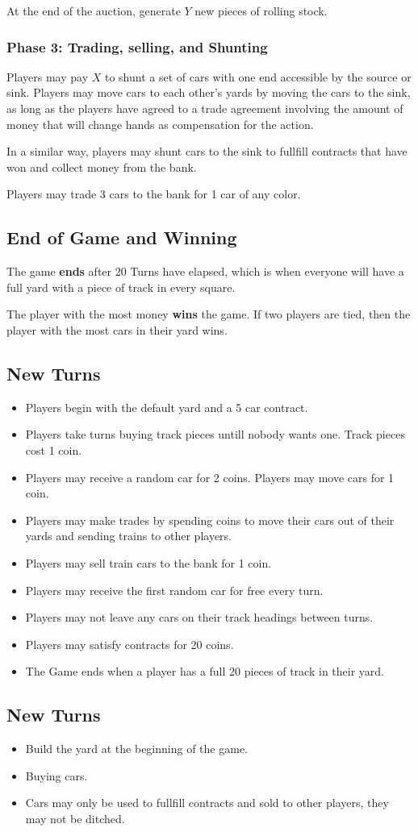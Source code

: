 \documentclass[12pt, letterpaper]{article}
\begin{document}
At the end of the auction, generate $Y$ new pieces of rolling stock.

\subsubsection{Phase 3: Trading, selling, and Shunting}

Players may pay $X$ to shunt a set of cars with one end accessible by the source or sink. Players may move cars to each other's yards by moving the cars to the sink, as long as the players have agreed to a trade agreement involving the amount of money that will change hands as compensation for the action.

In a similar way, players may shunt cars to the sink to fullfill contracts that have won and collect money from the bank.

Players may trade 3 cars to the bank for 1 car of any color.

\subsection{End of Game and Winning}
The game \textbf{ends} after 20 Turns have elapsed, which is when everyone will have a full yard with a piece of track in every square.

The player with the most money \textbf{wins} the game. If two players are tied, then the player with the most cars in their yard wins.


\subsection{New Turns}

\begin{itemize}
\item Players begin with the default yard and a 5 car contract.
\item Players take turns buying track pieces untill nobody wants one. Track pieces cost 1 coin.
\item Players may receive a random car for 2 coins. Players may move cars for 1 coin.
\item Players may make trades by spending coins to move their cars out of their yards and sending trains to other players.
\item Players may sell train cars to the bank for 1 coin.
\item Players may receive the first random car for free every turn.
\item Players may not leave any cars on their track headings between turns.
\item Players may satisfy contracts for 20 coins.
\item The Game ends when a player has a full 20 pieces of track in their yard.
\end{itemize}

\subsection{New Turns}

\begin{itemize}
\item Build the yard at the beginning of the game.
\item Buying cars.
\item Cars may only be used to fullfill contracts and sold to other players, they may not be ditched.
\end{itemize}

\end{document}
